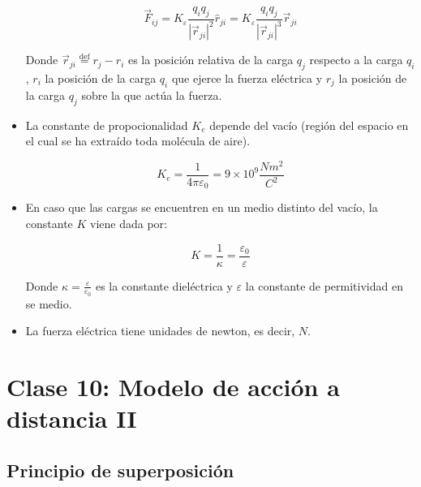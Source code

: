 \documentclass[a4paper,10pt]{article}
\begin{document}
\begin{itemize}
\begin{equation*}
    \boxed{\vec{F}_{ij}=
    K_\varepsilon\frac{q_{i}q_{j}}{\left\lvert\vec{r}_{ji}\right\lvert^2}\hat{r}_{ji}=
    K_\varepsilon\frac{q_{i}q_{j}}{\left\lvert\vec{r}_{ji}\right\lvert^3}\vec{r}_{ji}}
\end{equation*}

Donde $\vec{r}_{ji}\stackrel{\mathrm{def}}{=}r_{j}-r_{i}$ es la
posici\'on relativa de la carga $q_j$ respecto a la carga $q_i$,
$r_{i}$ la posici\'on de la carga $q_i$ que ejerce la fuerza el\'ectrica y $r_{j}$
la posici\'on de la carga $q_j$ sobre la que act\'ua la fuerza.

\item La constante de propocionalidad $K_{e}$ depende del vac\'io (regi\'on del espacio en el
cual se ha extra\'ido toda mol\'ecula de aire).

\begin{equation*}
    \boxed{K_e=\frac{1}{4\pi\varepsilon_0}=9\times10^9\frac{Nm^2}{C^2}}
\end{equation*}

\item En caso que las cargas se encuentren en un medio distinto del vac\'io, la constante
$K$ viene dada por:

\begin{equation*}
    \boxed{K=\frac{1}{\kappa}=\frac{\varepsilon_0}{\varepsilon}}
\end{equation*}

Donde $\kappa=\frac{\varepsilon}{\varepsilon_0}$ es la constante diel\'ectrica y $\varepsilon$ la
constante de permitividad en se medio.

\item La fuerza el\'ectrica tiene unidades de newton, es decir, $N$.

\end{itemize}


\section*{Clase 10: Modelo de acci\'on a distancia II}

\subsection*{Principio de superposici\'on}
\end{document}

